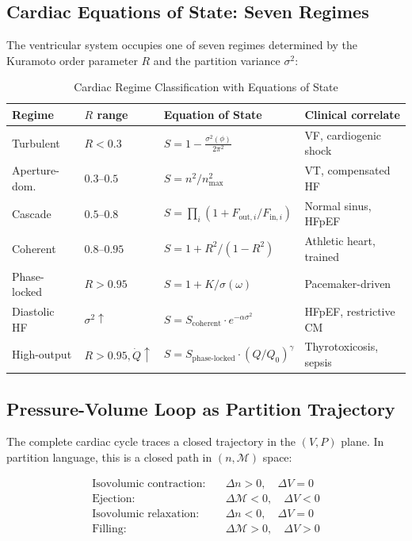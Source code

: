 \documentclass[12pt,a4paper]{article}
\theoremstyle{definition}
\begin{document}
\subsection{Cardiac Equations of State: Seven Regimes}

The ventricular system occupies one of seven regimes determined by the
Kuramoto order parameter $R$ and the partition variance $\sigma^2$:

\begin{table}[H]
\centering
\caption{Cardiac Regime Classification with Equations of State}
\label{tab:cardiac_regimes}
\begin{tabular}{llll}
\toprule
\textbf{Regime} & \textbf{$R$ range} & \textbf{Equation of State} & \textbf{Clinical correlate}\\
\midrule
Turbulent & $R < 0.3$ & $S = 1 - \frac{\sigma^2(\phi)}{2\pi^2}$ & VF, cardiogenic shock\\
Aperture-dom. & $0.3$--$0.5$ & $S = n^2/n^2_{\max}$ & VT, compensated HF\\
Cascade & $0.5$--$0.8$ & $S = \prod_i(1 + F_{\text{out},i}/F_{\text{in},i})$ & Normal sinus, HFpEF\\
Coherent & $0.8$--$0.95$ & $S = 1 + R^2/(1-R^2)$ & Athletic heart, trained\\
Phase-locked & $R > 0.95$ & $S = 1 + K/\sigma(\omega)$ & Pacemaker-driven\\
Diastolic HF & $\sigma^2 \uparrow$ & $S = S_{\text{coherent}} \cdot e^{-\alpha\sigma^2}$ & HFpEF, restrictive CM\\
High-output & $R > 0.95, \dot{Q}\uparrow$ & $S = S_{\text{phase-locked}} \cdot (Q/Q_0)^\gamma$ & Thyrotoxicosis, sepsis\\
\midrule
\end{tabular}
\end{table}

\subsection{Pressure-Volume Loop as Partition Trajectory}

The complete cardiac cycle traces a closed trajectory in the $(V, P)$ plane.
In partition language, this is a closed path in $(n, \mathcal{M})$ space:

\begin{align}
\text{Isovolumic contraction:} &\quad \Delta n > 0, \quad \Delta V = 0\\
\text{Ejection:} &\quad \Delta \mathcal{M} < 0, \quad \Delta V < 0\\
\text{Isovolumic relaxation:} &\quad \Delta n < 0, \quad \Delta V = 0\\
\text{Filling:} &\quad \Delta \mathcal{M} > 0, \quad \Delta V > 0
\end{align}
\end{document}
